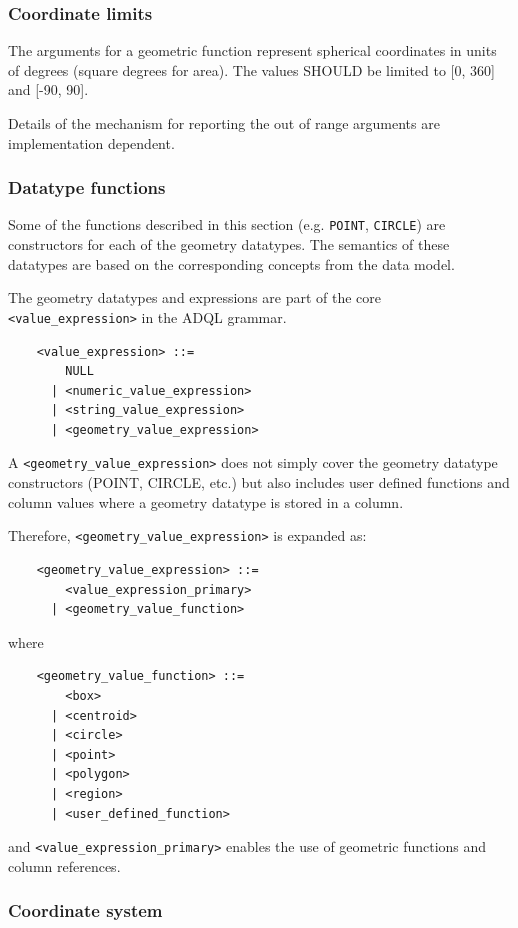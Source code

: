 \documentclass[11pt,a4paper]{ivoa}
\begin{document}
\subsubsection{Coordinate limits}
\label{sec:functions.geom.limits}

The arguments for a geometric function represent spherical coordinates
in units of degrees (square degrees for area).
The values SHOULD be limited to [0, 360] and [-90, 90].

Details of the mechanism for reporting the out of range arguments are
implementation dependent.

\subsubsection{Datatype functions}
\label{sec:functions.geom.type}

Some of the functions described in this section (e.g. \verb:POINT:,
\verb:CIRCLE:) are constructors for each of the geometry datatypes. The
semantics of these datatypes are based on the corresponding concepts from the
\STCSpec{} data model.

The geometry datatypes and expressions are part of the core
\verb:<value_expression>: in the ADQL grammar.

\begin{verbatim}
    <value_expression> ::=
        NULL
      | <numeric_value_expression>
      | <string_value_expression>
      | <geometry_value_expression>
\end{verbatim}

A \verb:<geometry_value_expression>: does not simply cover the geometry datatype
constructors (POINT, CIRCLE, etc.) but also includes user defined functions and
column values where a geometry datatype is stored in a column.

Therefore, \verb:<geometry_value_expression>: is expanded as:
\begin{verbatim}
    <geometry_value_expression> ::=
        <value_expression_primary>
      | <geometry_value_function>
\end{verbatim}
\noindent
where
\begin{verbatim}
    <geometry_value_function> ::=
        <box>
      | <centroid>
      | <circle>
      | <point>
      | <polygon>
      | <region>
      | <user_defined_function>
\end{verbatim}
and \verb:<value_expression_primary>: enables the use of geometric functions
and column references.

\subsubsection{Coordinate system}
\label{sec:geom.coordsys.param}
\end{document}
